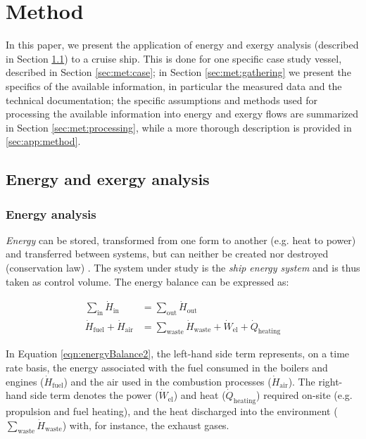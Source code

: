 \documentclass[preprint,12pt]{elsarticle}
\begin{document}
\section{Method} \label{sec:method}

In this paper, we present the application of energy and exergy analysis (described in Section \ref{sec:met:energyExergy}) to a cruise ship. This is done for one specific case study vessel, described in Section \ref{sec:met:case}; in Section \ref{sec:met:gathering} we present the specifics of the available information, in particular the measured data and the technical documentation; the specific assumptions and methods used for processing the available information into  energy and exergy flows are summarized in Section \ref{sec:met:processing}, while a more thorough description is provided in \ref{sec:app:method}. 

\subsection{Energy and exergy analysis} \label{sec:met:energyExergy}

\subsubsection{Energy analysis}

\emph{Energy} can be stored, transformed from one form to another (e.g. heat to power) and transferred between systems, but can neither be created nor destroyed (conservation law) \cite{Bejan1996}. The system under study is the \emph{ship energy system} and is thus taken as control volume. The energy balance can be expressed as:

\begin{align}
	\sum_{\mathrm{in}} \dot{H}_{\mathrm{in}} &= \sum_{\mathrm{out}} \dot{H}_{\mathrm{out}}  \label{eqn:energyBalance}  \\
	\dot{H}_{\mathrm{fuel}} + \dot{H}_{\mathrm{air}} &= \sum_{{\mathrm{waste}}}\dot{H}_{{\mathrm{waste}}}+\dot{W}_{\mathrm{el}}+\dot{Q}_{\mathrm{heating}} \label{eqn:energyBalance2}
\end{align}


In Equation \ref{eqn:energyBalance2}, the left-hand side term represents, on a time rate basis, the energy associated with the fuel consumed in the boilers and engines ($\dot{H}_{\mathrm{fuel}}$) and the air used in the combustion processes ($\dot{H}_{\mathrm{air}}$). The right-hand side term denotes the power ($\dot{W}_{\mathrm{el}}$) and heat ($\dot{Q}_{\mathrm{heating}}$) required on-site (e.g. propulsion and fuel heating), and the heat discharged into the environment ($\sum_{{\mathrm{waste}}}\dot{H}_{{\mathrm{waste}}}$) with, for instance, the exhaust gases.
\end{document}
